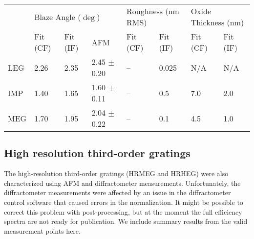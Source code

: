 \begin{table}[htbp]
   \centering
   {\small
   \begin{tabular}{@{} llllllll @{}} %
      \toprule
    &  \multicolumn{3}{l}{Blaze Angle ($\deg$)} & \multicolumn{2}{l}{Roughness (nm RMS)} &  \multicolumn{2}{l}{Oxide Thickness (nm)} \\
      \cmidrule(lr){2-4}    \cmidrule(lr){5-6}    \cmidrule(lr){7-8}  
 &	Fit (CF) & Fit (IF) & AFM  & Fit (CF) & Fit (IF) &  Fit (CF) & Fit (IF)\\
 \cmidrule(lr){2-2}   \cmidrule(lr){3-3} \cmidrule(lr){4-4} \cmidrule(lr){5-5} \cmidrule(lr){6-6}  \cmidrule(lr){7-7}  \cmidrule(lr){8-8}
LEG & 2.26 & 2.35 & 2.45 $\pm$ 0.20 & -- & 0.025 & N/A & N/A \\
IMP & 1.40 & 1.65 & 1.60 $\pm$ 0.11 & -- & 0.5 & 7.0 & 2.0 \\
MEG & 1.70 & 1.95 & 2.04  $\pm$ 0.22 & -- & 0.1 & 4.5 & 1.0\\
      \bottomrule
   \end{tabular}
   }
   \label{fittingResultsTable}
\end{table}

\subsection{High resolution third-order gratings}
The high-resolution third-order gratings (HRMEG and HRHEG) were also characterized using AFM and diffractometer measurements.  Unfortunately, the diffractometer measurements were affected by an issue in the diffractometer control software that caused errors in the normalization.  It might be possible to correct this problem with post-processing, but at the moment the full efficiency spectra are not ready for publication.  We include summary results from the valid measurement points here.

